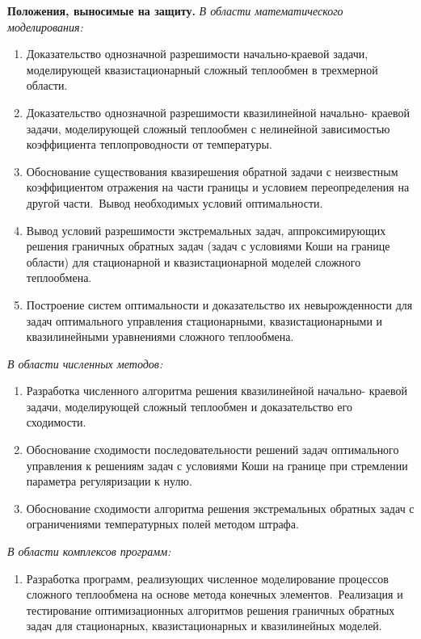     \textbf{Положения, выносимые на защиту.}
    \textit{В области математического моделирования:}
    \begin{enumerate}[leftmargin=5.5mm]
        \item Доказательство однозначной разрешимости начально-краевой задачи,
        моделирующей квазистационарный сложный теплообмен в трехмерной
        области.
        \item Доказательство однозначной разрешимости квазилинейной начально-
        краевой задачи, моделирующей сложный теплообмен с нелинейной
        зависимостью коэффициента теплопроводности от температуры.
        \item Обоснование существования квазирешения обратной задачи с неизвестным
        коэффициентом отражения на части границы и условием переопределения на
        другой части.\ Вывод необходимых условий оптимальности.
        \item Вывод условий разрешимости экстремальных задач, аппроксимирующих
        решения граничных обратных задач (задач с условиями Коши на границе
        области) для стационарной и квазистационарной моделей сложного
        теплообмена.
        \item Построение систем оптимальности и доказательство их невырожденности
        для задач оптимального управления стационарными, квазистационарными и
        квазилинейными уравнениями сложного теплообмена.
        \setcounter{nameOfYourChoice}{\value{enumi}}
    \end{enumerate}
    \textit{В области численных методов:}
    \begin{enumerate}[leftmargin=5.5mm]
        \setcounter{enumi}{\value{nameOfYourChoice}}
        \item Разработка численного алгоритма решения квазилинейной начально-
        краевой задачи, моделирующей сложный теплообмен и доказательство его
        сходимости.
        \item Обоснование сходимости последовательности решений задач
        оптимального управления к решениям задач с условиями Коши на границе
        при стремлении параметра регуляризации к нулю.
        \item Обоснование сходимости алгоритма решения экстремальных обратных
        задач с ограничениями температурных полей методом штрафа.
        \setcounter{nameOfYourChoice}{\value{enumi}}
    \end{enumerate}
    \textit{В области комплексов программ:}
    \begin{enumerate}[leftmargin=5.5mm]
        \setcounter{enumi}{\value{nameOfYourChoice}}
        \item Разработка программ, реализующих численное моделирование процессов
        сложного теплообмена на основе метода конечных элементов.\ Реализация и
        тестирование оптимизационных алгоритмов решения граничных обратных
        задач для стационарных, квазистационарных и квазилинейных моделей.
    \end{enumerate}


